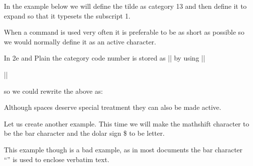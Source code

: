 In the example below we will define the tilde as category 13 and then define it to expand so that it typesets the subscript 1.




When a command is used very often it is preferable to be as short as possible so we would normally define it as an active character. 

In \latex2e and Plain the category code number is stored as |\active| by using |\chardef|

|\chardef{}|

so we could rewrite the above as:


Although spaces deserve special treatment they can also be made active.


Let us create another example. This time we will make the mathshift character to be the bar {\textbar} character and the dolar sign \$ to be letter.


This example though is a bad example, as in most \latexe documents the bar character \enquote{\textbar} is used to enclose  verbatim text.



